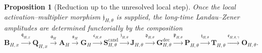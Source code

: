 \documentclass[11pt]{article}
\newtheorem{proposition}[definition]{Proposition}
\begin{document}
\begin{proposition}[Reduction up to the unresolved local step]
\label{prop:reduction-up-to-step5}
Once the local activation--multiplier morphism $\mathfrak j_{H,\theta}$ is supplied, the long-time Landau--Zener amplitudes are determined functorially by the composition
\[
\mathbf B_{H,x}
\xrightarrow{\mathfrak q_{H,x}}
\mathbf Q_{H,x}
\xrightarrow{\mathfrak a_H}
\mathbf A_H
\xrightarrow{\mathfrak s_H}
\mathbf G_H
\xrightarrow{\mathfrak c_{H,\theta}}
\mathbf S^{\mathrm{cand}}_{H,\theta}
\xrightarrow{\mathfrak j_{H,\theta}}
\mathbf J_{H,\theta}
\xrightarrow{\mathfrak d_{H,\theta}}
\mathbf G^{\mathrm{dec}}_{H,\theta}
\xrightarrow{\mathfrak p_{H,\theta}}
\mathbf P_{H,\theta}
\xrightarrow{\mathfrak t_{H,\theta}}
\mathbf T_{H,\theta}
\xrightarrow{\mathfrak e_{H,\theta,\gamma}}
\mathbf O_{H,\theta}.
\]
\end{proposition}
\end{document}
